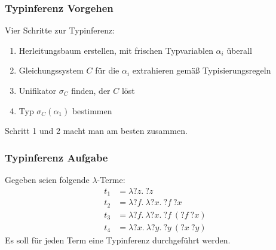 \documentclass{beamer}
\date{2017-01-09/10}
\begin{document}
\normalsize
\normalem

\begin{frame}[plain]
  \titlepage
\end{frame}

\begin{frame}
  \frametitle{Typinferenz Vorgehen}
  Vier Schritte zur Typinferenz:
  \begin{enumerate}
  \item Herleitungsbaum erstellen, mit frischen Typvariablen $α_i$ überall
  \item Gleichungssystem $C$ für die $α_i$ extrahieren gemäß Typisierungsregeln
  \item Unifikator $σ_C$ finden, der $C$ löst
  \item Typ $σ_C(α_1)$ bestimmen
  \end{enumerate}
  Schritt 1 und 2 macht man am besten zusammen.
\end{frame}

\begin{frame}
  \frametitle{Typinferenz Aufgabe}
  Gegeben seien folgende $λ$-Terme:
  \begin{align*}
    t_1 &= λ?z.~?z \\
    t_2 &= λ?f.~λ?x.~?f~?x \\
    t_3 &= λ?f.~λ?x.~?f~(?f~?x) \\
    t_4 &= λ?x.~λ?y.~?y~(?x~?y)
  \end{align*}
  Es soll für jeden Term eine Typinferenz durchgeführt werden.
\end{frame}
\end{document}
